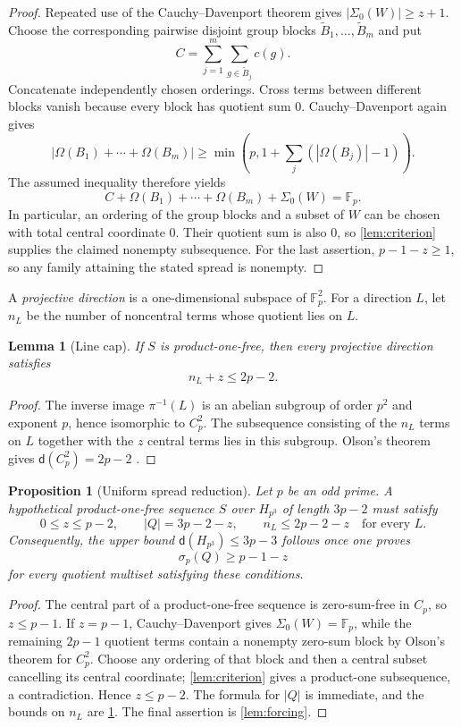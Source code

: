 \documentclass[11pt]{amsart}
\newtheorem{proposition}[theorem]{Proposition}
\newtheorem{lemma}[theorem]{Lemma}
\theoremstyle{definition}
\newcommand{\F}{\mathbb F}
\newcommand{\dd}{\mathsf d}
\newcommand{\Om}{\Omega}
\newcommand{\Sig}{\Sigma}
\begin{document}
\begin{proof}
Repeated use of the Cauchy--Davenport theorem
\cite{Nathanson1996} gives $|\Sig_0(W)|\geq z+1$.
Choose the corresponding pairwise disjoint group blocks
$\widetilde B_1,\ldots,\widetilde B_m$ and put
\[
C=\sum_{j=1}^m\sum_{g\in\widetilde B_j}c(g).
\]
Concatenate independently chosen orderings.  Cross terms between
different blocks vanish because every block has quotient sum $0$.
Cauchy--Davenport again gives
\[
\left|\Om(B_1)+\cdots+\Om(B_m)\right|
\geq \min\left(p,1+\sum_j(|\Om(B_j)|-1)\right).
\]
The assumed inequality therefore yields
\[
C+\Om(B_1)+\cdots+\Om(B_m)+\Sig_0(W)=\F_p.
\]
In particular, an ordering of the group blocks and a subset of $W$
can be chosen with total central coordinate $0$.  Their quotient sum
is also $0$, so \cref{lem:criterion} supplies the claimed nonempty
subsequence.  For the last assertion, $p-1-z\geq1$, so any family
attaining the stated spread is nonempty.
\end{proof}

A \emph{projective direction} is a one-dimensional subspace of
$\F_p^2$.  For a direction $L$, let $n_L$ be the number of noncentral
terms whose quotient lies on $L$.

\begin{lemma}[Line cap]\label{lem:linecap}
If $S$ is product-one-free, then every projective direction satisfies
\[
n_L+z\leq 2p-2.
\]
\end{lemma}

\begin{proof}
The inverse image $\pi^{-1}(L)$ is an abelian subgroup of order $p^2$
and exponent $p$, hence isomorphic to $C_p^2$.  The subsequence
consisting of the $n_L$ terms on $L$ together with the $z$ central
terms lies in this subgroup.  Olson's theorem gives
$\dd(C_p^2)=2p-2$ \cite{Olson1969I,Olson1969II}.
\end{proof}

\begin{proposition}[Uniform spread reduction]\label{prop:uniform}
Let $p$ be an odd prime.  A hypothetical product-one-free sequence
$S$ over $H_{p^3}$ of length $3p-2$ must satisfy
\[
0\leq z\leq p-2,\qquad |Q|=3p-2-z,
\qquad n_L\leq2p-2-z\quad\text{for every }L.
\]
Consequently, the upper bound $\dd(H_{p^3})\leq3p-3$ follows once one
proves
\[
\sigma_p(Q)\geq p-1-z
\]
for every quotient multiset satisfying these conditions.
\end{proposition}

\begin{proof}
The central part of a product-one-free sequence is zero-sum-free in
$C_p$, so $z\leq p-1$.  If $z=p-1$, Cauchy--Davenport gives
$\Sig_0(W)=\F_p$, while the remaining $2p-1$ quotient terms contain a
nonempty zero-sum block by Olson's theorem for $C_p^2$.  Choose any
ordering of that block and then a central subset cancelling its central
coordinate; \cref{lem:criterion} gives a product-one subsequence, a
contradiction.  Hence $z\leq p-2$.  The formula for $|Q|$ is immediate,
and the bounds on $n_L$ are \cref{lem:linecap}.  The final assertion is
\cref{lem:forcing}.
\end{proof}
\end{document}
